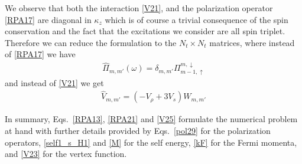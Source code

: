 We observe that both the interaction \eqref{V21}, and the polarization operator \eqref{RPA17} are diagonal in $\kappa_z$ which is of course a trivial consequence of the spin conservation and the fact that the excitations we consider are all spin triplet.
Therefore we can reduce the formulation to the $N_t \times N_t$ matrices, where instead of \eqref{RPA17} we have
\begin{align}\label{RPA21}
\hat{\Pi}_{m,m'}(\omega) = \delta_{m,m'} \Pi^{m,\downarrow}_{m-1,\uparrow}
\end{align}
and instead of \eqref{V21} we get
\begin{align}\label{V25}
\hat{V}_{m,m'} = (-V_{\rho} + 3 V_s) W_{m,m'}
\end{align}

In summary, Eqs.~\eqref{RPA13}, \eqref{RPA21} and \eqref{V25} formulate the numerical problem at hand with further details provided by Eqs.~\eqref{pol29} for the polarization operators, \eqref{self1_s_H1} and \eqref{M} for the self energy, \eqref{kF} for the Fermi momenta, and \eqref{V23} for the vertex function.

